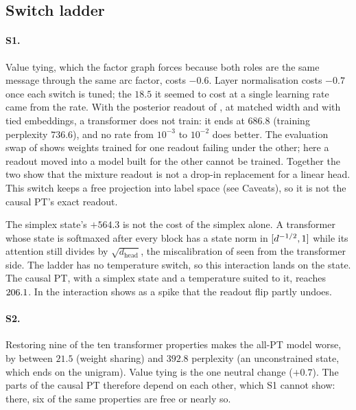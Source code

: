 \begin{table}[t]
\centering\scriptsize

\caption{The global variable in the standardised configuration of : number of
values $m$, initialisation sd, whether $\Bglob$ shares the $L_2$ of the other factors, draw,
three seeds. $H(Q_g)/\max$ is the entropy of the global variable's posterior relative to its
maximum; $1.000$ means uniform.}
\label{tab:globalhead}
\end{table}

\subsection{Switch ladder}
\label{app:grid-switches}

\paragraph{S1.}
Value tying, which the factor graph forces because both roles are the same message through the
same arc factor, costs $-0.6$. Layer normalisation costs $-0.7$ once each switch is tuned; the
$18.5$ it seemed to cost at a single learning rate came from the rate. With the posterior readout
of , at matched width and with tied embeddings, a transformer does not train: it
ends at $686.8$ (training perplexity $736.6$), and no rate from $10^{-3}$ to $10^{-2}$ does
better. The evaluation swap of
 shows weights trained for one readout failing under the other; here a readout
moved into a model built for the other cannot be trained. Together the two show that the mixture
readout is not a drop-in replacement for a linear head. This switch keeps a free projection into
label space (see Caveats), so it is not the causal PT's exact readout.

The simplex state's $+564.3$ is not the cost of the simplex alone. A transformer whose state is
softmaxed after every block has a state norm in $[d^{-1/2}, 1]$ while its attention still
divides by $\sqrt{d_{\text{head}}}$, the miscalibration of  seen from the
transformer side. The ladder has no temperature switch, so this interaction lands on the state.
The causal PT, with a simplex state and a temperature suited to it, reaches $206.1$. In
 the interaction shows as a spike that the readout flip partly undoes.

\paragraph{S2.}
Restoring nine of the ten transformer properties makes the all-PT model worse, by between
$21.5$ (weight sharing) and $392.8$ perplexity (an unconstrained state, which ends on the
unigram). Value tying is the one
neutral change ($+0.7$). The parts of the causal PT therefore depend on each other, which S1
cannot show: there, six of the same properties are free or nearly so.


